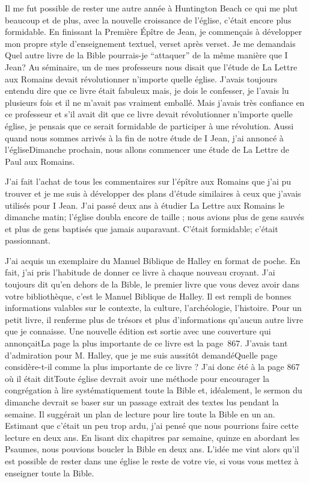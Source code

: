 Il me fut possible de rester une autre année à Huntington Beach ce qui me plut beaucoup et de plus, avec la nouvelle
croissance de l’église, c’était encore plus formidable. En finissant la Première Épître de Jean, je commençais à
développer mon propre style d’enseignement textuel, verset après verset. Je me demandais \og Quel autre livre de la
Bible pourrais-je ``attaquer'' de la même manière que I Jean? \fg{} Au séminaire, un de mes professeurs nous disait que
l'étude de La Lettre aux Romains devait révolutionner n’importe quelle église. J’avais toujours entendu dire que ce
livre était fabuleux mais, je dois le confesser, je l’avais lu plusieurs fois et il ne m’avait pas vraiment emballé. Mais
j’avais très confiance en ce professeur et s’il avait dit que ce livre devait révolutionner n’importe quelle église, je
pensais que ce serait formidable de participer à une révolution. Aussi quand nous sommes arrivés à la fin de notre
étude de I Jean, j’ai annoncé à l’église\frcolon\og Dimanche prochain, nous allons commencer une étude de La Lettre de Paul
aux Romains.\fg{}

J'ai fait l’achat de tous les commentaires sur l’épître aux Romains que j'ai pu trouver et je me suis à développer des
plans d’étude similaires à ceux que j’avais utilisés pour I Jean. J'ai passé deux ans à étudier La Lettre aux Romains le
dimanche matin; l’église doubla encore de taille ; nous avions plus de gens sauvés et plus de gens baptisés que
jamais auparavant. C’était formidable; c'était passionnant.

J'ai acquis un exemplaire du Manuel Biblique de Halley en format de poche. En fait, j'ai pris l’habitude de donner ce
livre à chaque nouveau croyant. J’ai toujours dit qu'en dehors de la Bible, le premier livre que vous devez avoir dans
votre bibliothèque, c'est le Manuel Biblique de Halley. Il est rempli de bonnes informations valables sur le contexte, la
culture, l’archéologie, l’histoire. Pour un petit livre, il renferme plus de trésors et plus d'informations qu’aucun autre
livre que je connaisse. Une nouvelle édition est sortie avec une couverture qui annonçait\frcolon\og La page la plus importante
de ce livre est la page~867.\fg{} J'avais tant d'admiration pour M. Halley, que je me suis aussitôt demandé\frcolon\og Quelle page
considère-t-il comme la plus importante de ce livre ?\fg{} J'ai donc été à la page 867 où il était dit\frcolon\og Toute église devrait
avoir une méthode pour encourager la congrégation à lire systématiquement toute la Bible et, idéalement, le sermon
du dimanche devrait se baser sur un passage extrait des textes lus pendant la semaine.\fg{} Il suggérait un plan de
lecture pour lire toute la Bible en un an. Estimant que c’était un peu trop ardu, j'ai pensé que nous pourrions faire
cette lecture en deux ans. En lisant dix chapitres par semaine, quinze en abordant les Psaumes, nous pouvions
boucler la Bible en deux ans. L’idée me vint alors qu’il est possible de rester dans une église le reste de votre vie, si
vous vous mettez à enseigner toute la Bible.

